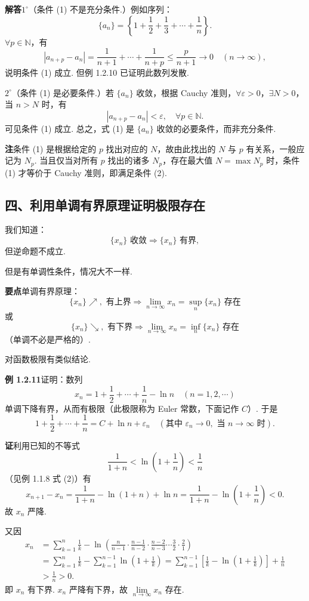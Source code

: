 \documentclass[UTF8,12pt,a4paper,fontset=fandol]{ctexart}
\begin{document}
\noindent\textbf{解答}\quad $1^\circ$（条件 (1) 不是充分条件.）例如序列：
\[
  \{a_n\}=\left\{1+\frac12+\frac13+\cdots+\frac1n\right\}.
\]
$\forall p\in\mathbb{N}$，有
\[
  |a_{n+p}-a_n|=\frac1{n+1}+\cdots+\frac1{n+p}\le \frac{p}{n+1}\to0\quad(n\to\infty),
\]
说明条件 (1) 成立. 但例 1.2.10 已证明此数列发散.

$2^\circ$（条件 (1) 是必要条件.）若 $\{a_n\}$ 收敛，根据 Cauchy 准则，$\forall\varepsilon>0$，$\exists N>0$，当 $n>N$ 时，有
\[
  |a_{n+p}-a_n|<\varepsilon,\quad \forall p\in\mathbb{N}.
\tag{2}
\]
可见条件 (1) 成立. 总之，式 (1) 是 $\{a_n\}$ 收敛的必要条件，而非充分条件.

\noindent\textbf{注}\quad 条件 (1) 是根据给定的 $p$ 找出对应的 $N$，故由此找出的 $N$ 与 $p$ 有关系，一般应记为 $N_p$. 当且仅当对所有 $p$ 找出的诸多 $N_p$，存在最大值 $N=\max N_p$ 时，条件 (1) 才等价于 Cauchy 准则，即满足条件 (2).

\subsection*{四、利用单调有界原理证明极限存在}

我们知道：
\[
  \{x_n\}\text{ 收敛}\Rightarrow \{x_n\}\text{ 有界},
\]
但逆命题不成立.

但是有单调性条件，情况大不一样.

\noindent\textbf{要点}\quad 单调有界原理：
\[
  \{x_n\}\nearrow,\text{ 有上界}\Rightarrow \lim_{n\to\infty}x_n=\sup_n\{x_n\}\text{ 存在}
\]
或
\[
  \{x_n\}\searrow,\text{ 有下界}\Rightarrow \lim_{n\to\infty}x_n=\inf_n\{x_n\}\text{ 存在}
\]
（单调不必是严格的）.

对函数极限有类似结论.

\noindent\textbf{例 1.2.11}\quad 证明：数列
\[
  x_n=1+\frac12+\cdots+\frac1n-\ln n\quad(n=1,2,\cdots)
\]
单调下降有界，从而有极限（此极限称为 Euler 常数，下面记作 $C$）. 于是
\[
  1+\frac12+\cdots+\frac1n=C+\ln n+\varepsilon_n
  \quad(\text{其中 }\varepsilon_n\to0,\text{ 当 }n\to\infty\text{ 时}).
\]

\noindent\textbf{证}\quad 利用已知的不等式
\[
  \frac1{1+n}<\ln\left(1+\frac1n\right)<\frac1n
\]
（见例 1.1.8 式 (2)）有
\[
  x_{n+1}-x_n=\frac1{1+n}-\ln(1+n)+\ln n
  =\frac1{1+n}-\ln\left(1+\frac1n\right)<0.
\]
故 $x_n$ 严降.

又因
\[
\begin{aligned}
x_n&=\sum_{k=1}^n\frac1k-\ln\left(\frac n{n-1}\cdot\frac{n-1}{n-2}\cdot\frac{n-2}{n-3}\cdots\frac32\cdot\frac21\right)\\
&=\sum_{k=1}^n\frac1k-\sum_{k=1}^{n-1}\ln\left(1+\frac1k\right)
=\sum_{k=1}^{n-1}\left[\frac1k-\ln\left(1+\frac1k\right)\right]+\frac1n\\
&>\frac1n>0.
\end{aligned}
\]
即 $x_n$ 有下界. $x_n$ 严降有下界，故 $\lim\limits_{n\to\infty}x_n$ 存在.
\end{document}
